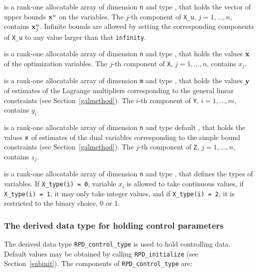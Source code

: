 \documentclass{galahad}
\newcommand{\packagename}{RPD}
\begin{document}
\begin{description}
 is a rank-one allocatable array of dimension {\tt n} and type
\realdp, that holds
the vector of upper bounds ${\mathbf{x}}^{u}$ on the variables.
The $j$-th component of {\tt X\_u}, $j = 1, \ldots , n$,
contains ${\mathbf{x}}_{j}^{u}$.
Infinite bounds are allowed by setting the corresponding
components of {\tt X\_u} to any value larger than that {\tt infinity}.

 is a rank-one allocatable array of dimension {\tt n} and type
\realdp,
that holds the values ${\mathbf{x}}$ of the optimization variables.
The $j$-th component of {\tt X}, $j = 1,  \ldots , n$, contains $x_{j}$.

 is a rank-one allocatable array of dimension {\tt m} and type
\realdp, that holds
the values ${\mathbf{y}}$ of estimates  of the Lagrange multipliers
corresponding to the general linear constraints (see Section~\ref{galmethod}).
The $i$-th component of {\tt Y}, $i = 1,  \ldots ,  m$, contains $y_{i}$.

 is a rank-one allocatable array of dimension {\tt n} and type default
\realdp, that holds
the values ${\mathbf{z}}$ of estimates  of the dual variables
corresponding to the simple bound constraints (see Section~\ref{galmethod}).
The $j$-th component of {\tt Z}, $j = 1,  \ldots ,  n$, contains $z_{j}$.

 is a rank-one allocatable array of dimension {\tt n} and type
\integer, that defines the types of variables. If {\tt X\_type(i) = 0},
variable $x_i$ is allowed to take continuous values, if {\tt X\_type(i) = 1},
it may only take integer values, and if {\tt X\_type(i) = 2}, it is
restricted to the binary choice, 0 or 1.

\end{description}


\subsubsection{The derived data type for holding control
 parameters}\label{typecontrol}
The derived data type
{\tt \packagename\_control\_type}
is used to hold controlling data. Default values may be obtained by calling
{\tt \packagename\_initialize}
(see Section~\ref{subinit}). The components of
{\tt \packagename\_control\_type}
are:
\end{document}

